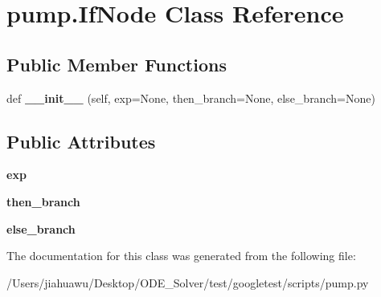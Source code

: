 \hypertarget{classpump_1_1_if_node}{}\section{pump.\+If\+Node Class Reference}
\label{classpump_1_1_if_node}
\subsection*{Public Member Functions}
\begin{DoxyCompactItemize}
\item 
\mbox{\label{classpump_1_1_if_node_ab8bff21c18d60b461f7b6fa9dfa59f7c}} 
def {\bfseries \+\_\+\+\_\+init\+\_\+\+\_\+} (self, exp=None, then\+\_\+branch=None, else\+\_\+branch=None)
\end{DoxyCompactItemize}
\subsection*{Public Attributes}
\begin{DoxyCompactItemize}
\item 
\mbox{\label{classpump_1_1_if_node_a92042e4262196ffd7366350539f512d8}} 
{\bfseries exp}
\item 
\mbox{\label{classpump_1_1_if_node_aa9e2e488564629f8dc0d64d165a19ffa}} 
{\bfseries then\+\_\+branch}
\item 
\mbox{\label{classpump_1_1_if_node_a12e422b16ed4291f15cd95cd6e7f81eb}} 
{\bfseries else\+\_\+branch}
\end{DoxyCompactItemize}


The documentation for this class was generated from the following file\+:\begin{DoxyCompactItemize}
\item 
/\+Users/jiahuawu/\+Desktop/\+O\+D\+E\+\_\+\+Solver/test/googletest/scripts/pump.\+py\end{DoxyCompactItemize}
